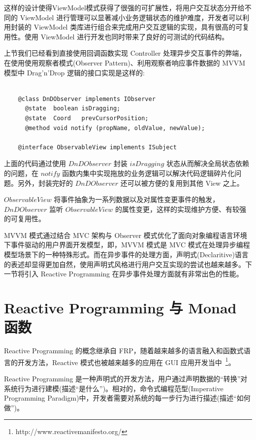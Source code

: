 这样的设计使得ViewModel模式获得了很强的可扩展性，将用户交互状态分开给不同的 ViewModel 进行管理可以显著减小业务逻辑状态的维护难度，开发者可以利用封装的 ViewModel 类库进行组合来完成用户交互逻辑的实现，具有很高的可复用性。使用 ViewModel 进行开发也同时带来了良好的可测试的代码结构。

上节我们已经看到直接使用回调函数实现 Controller 处理异步交互事件的弊端，在使用使用观察者模式(Observer Pattern)、利用观察者响应事件数据的 MVVM 模型中 Drag'n'Drop 逻辑的接口实现是这样的:

\begin{verbatim}

    @class DnDObserver implements IObserver
      @state  boolean isDragging;
      @state  Coord   prevCursorPosition;
      @method void notify (propName, oldValue, newValue);

    @interface ObservableView implements ISubject

\end{verbatim}

上面的代码通过使用 $DnDObserver$ 封装 $isDragging$ 状态从而解决全局状态依赖的问题，在 $notify$ 函数内集中实现拖放的业务逻辑可以解决代码逻辑碎片化问题。另外，封装完好的 $DnDObserver$ 还可以被方便的复用到其他 View 之上。

$ObservableView$ 将事件抽象为一系列数据以及对属性变更事件的触发，$DnDObserver$ 监听 $ObservableView$ 的属性变更，这样的实现维护方便、有较强的可复用性。

MVVM 模式通过结合 MVC 架构与 Observer 模式优化了面向对象编程语言环境下事件驱动的用户界面开发模型，即，MVVM 模式是 MVC 模式在处理异步编程模型场景下的一种特殊形式。而在异步事件的处理方面，声明式(Declaritive)语言的表述却显得更加自然，使用声明式风格进行用户交互实现的尝试也越来越多。下一节将引入 Reactive Programming 在异步事件处理方面就有非常出色的性能。

\section{Reactive Programming 与 Monad 函数}

Reactive Programming 的概念继承自 FRP，随着越来越多的语言融入和函数式语言的开发方法，Reactive 模式也被越来越多的应用在 GUI 应用开发当中~\footnote{http://www.reactivemanifesto.org/}。

Reactive Programming 是一种声明式的开发方法，用户通过声明数据的“转换”对系统行为进行建模(描述“是什么”)。相对的，命令式编程范型(Imperative Programming Paradigm)中，开发者需要对系统的每一步行为进行描述(描述“如何做”)。

